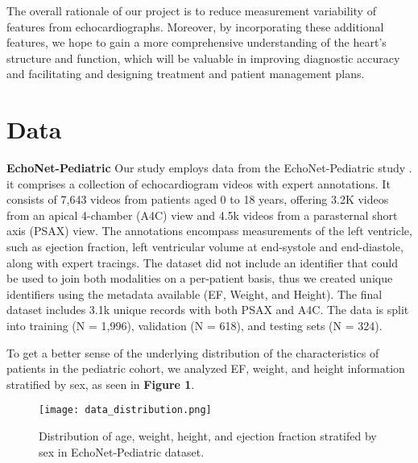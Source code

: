 \documentclass{article}
\begin{document}
\noindent 
The overall rationale of our project is to reduce measurement variability of features from echocardiographs. Moreover, by incorporating these additional features, we hope to gain a more comprehensive understanding of the heart's structure and function, which will be valuable in improving diagnostic accuracy and facilitating and designing treatment and patient management plans.

\section{Data}

\textbf{EchoNet-Pediatric} Our study employs data from the EchoNet-Pediatric study \cite{echonet2}. it comprises a collection of echocardiogram videos with expert annotations. It consists of 7,643 videos from patients aged 0 to 18 years, offering 3.2K videos from an apical 4-chamber (A4C) view and 4.5k videos from a parasternal short axis (PSAX) view.  The annotations encompass measurements of the left ventricle, such as ejection fraction, left ventricular volume at end-systole and end-diastole, along with expert tracings. The dataset did not include an identifier that could be used to join both modalities on a per-patient basis, thus we created unique identifiers using the metadata available (EF, Weight, and Height). The final dataset includes 3.1k unique records with both PSAX and A4C. The data is split into training (N = 1,996), validation (N = 618), and testing sets (N = 324). 

To get a better sense of the underlying distribution of the characteristics of patients in the pediatric cohort, we analyzed EF, weight, and height information stratified by sex, as seen in \textbf{Figure 1}. 

\begin{figure} [H]
  \centering
\texttt{[image: data\_distribution.png]}
  \caption{Distribution of age, weight, height, and ejection fraction stratifed by sex in EchoNet-Pediatric dataset.}
\end{figure}
\end{document}
